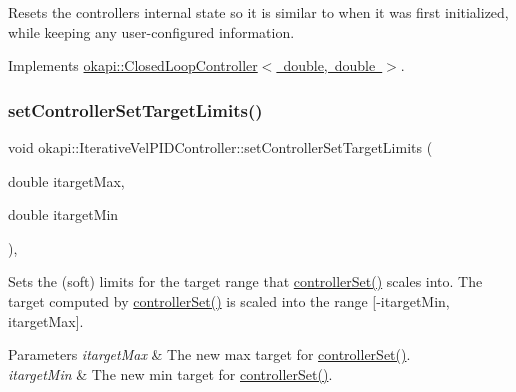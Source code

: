 Resets the controller\textquotesingle{}s internal state so it is similar to when it was first initialized, while keeping any user-\/configured information. 

Implements \mbox{\hyperlink{classokapi_1_1ClosedLoopController_a7dd6ce28b3e38bdf987514a1b6c83c8c}{okapi\+::\+Closed\+Loop\+Controller$<$ double, double $>$}}.

\mbox{\label{classokapi_1_1IterativeVelPIDController_a054d5bff10ba504b9f72db567ad45bfb}} 
\subsubsection{\texorpdfstring{setControllerSetTargetLimits()}{setControllerSetTargetLimits()}}
{\footnotesize\ttfamily void okapi\+::\+Iterative\+Vel\+P\+I\+D\+Controller\+::set\+Controller\+Set\+Target\+Limits (\begin{DoxyParamCaption}\item[{double}]{itarget\+Max,  }\item[{double}]{itarget\+Min }\end{DoxyParamCaption})\hspace{0.3cm}{\ttfamily [override]}, {\ttfamily [virtual]}}

Sets the (soft) limits for the target range that \mbox{\hyperlink{classokapi_1_1IterativeVelPIDController_a50c069752036261395871fbe175ae101}{controller\+Set()}} scales into. The target computed by \mbox{\hyperlink{classokapi_1_1IterativeVelPIDController_a50c069752036261395871fbe175ae101}{controller\+Set()}} is scaled into the range \mbox{[}-\/itarget\+Min, itarget\+Max\mbox{]}.


\begin{DoxyParams}{Parameters}
{\em itarget\+Max} & The new max target for \mbox{\hyperlink{classokapi_1_1IterativeVelPIDController_a50c069752036261395871fbe175ae101}{controller\+Set()}}. \\
\hline
{\em itarget\+Min} & The new min target for \mbox{\hyperlink{classokapi_1_1IterativeVelPIDController_a50c069752036261395871fbe175ae101}{controller\+Set()}}. \\
\hline
\end{DoxyParams}


